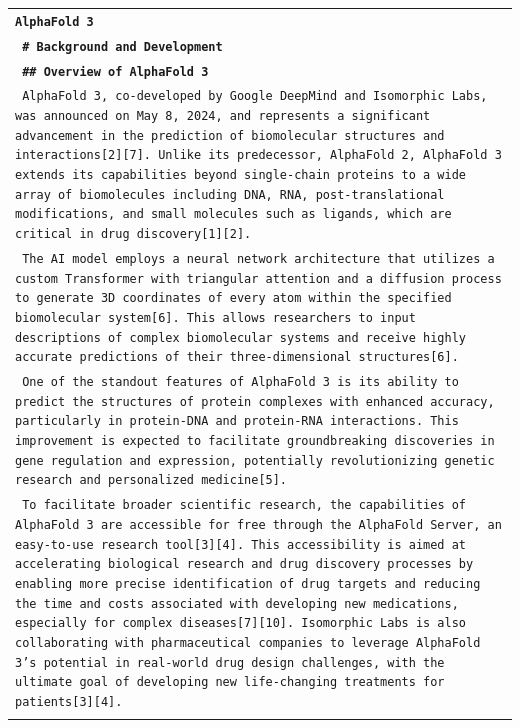 \begin{longtable}{p{\textwidth}}
\toprule
\texttt{\small{\textbf{AlphaFold 3}}} \\
\texttt{\small{\textbf{ \# Background and Development }}} \\
\vspace{1pt}
\texttt{\small{\textbf{ \#\# Overview of AlphaFold 3 }}} \\
\texttt{\small{ AlphaFold 3, co-developed by Google DeepMind and Isomorphic Labs, was announced on May 8, 2024, and represents a significant advancement in the prediction of biomolecular structures and interactions[2][7]. Unlike its predecessor, AlphaFold 2, AlphaFold 3 extends its capabilities beyond single-chain proteins to a wide array of biomolecules including DNA, RNA, post-translational modifications, and small molecules such as ligands, which are critical in drug discovery[1][2]. }} \\
\texttt{\small{ The AI model employs a neural network architecture that utilizes a custom Transformer with triangular attention and a diffusion process to generate 3D coordinates of every atom within the specified biomolecular system[6]. This allows researchers to input descriptions of complex biomolecular systems and receive highly accurate predictions of their three-dimensional structures[6]. }} \\
\texttt{\small{ One of the standout features of AlphaFold 3 is its ability to predict the structures of protein complexes with enhanced accuracy, particularly in protein-DNA and protein-RNA interactions. This improvement is expected to facilitate groundbreaking discoveries in gene regulation and expression, potentially revolutionizing genetic research and personalized medicine[5]. }} \\
\texttt{\small{ To facilitate broader scientific research, the capabilities of AlphaFold 3 are accessible for free through the AlphaFold Server, an easy-to-use research tool[3][4]. This accessibility is aimed at accelerating biological research and drug discovery processes by enabling more precise identification of drug targets and reducing the time and costs associated with developing new medications, especially for complex diseases[7][10]. Isomorphic Labs is also collaborating with pharmaceutical companies to leverage AlphaFold 3's potential in real-world drug design challenges, with the ultimate goal of developing new life-changing treatments for patients[3][4]. }} \\
\vspace{1pt}

\end{longtable}
